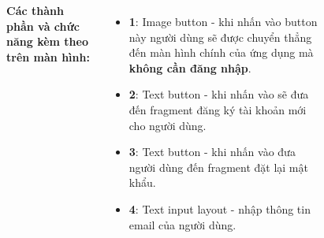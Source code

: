 \documentclass{beamer}
\begin{document}
\begin{frame}
\begin{columns}
\begin{figure}
        \end{figure}
        \indent \textbf{Các thành phần và chức năng kèm theo trên màn hình:}
        \begin{itemize}
            \item \textbf{1}: Image button - khi nhấn vào button này người dùng sẽ được chuyển thẳng đến màn hình chính của ứng dụng mà \textbf{không cần đăng nhập}.
            \item \textbf{2}: Text button - khi nhấn vào sẽ đưa đến fragment đăng ký tài khoản mới cho người dùng.
            \item \textbf{3}: Text button - khi nhấn vào đưa người dùng đến fragment đặt lại mật khẩu.
            \item \textbf{4}: Text input layout - nhập thông tin email của người dùng.
        \end{itemize}
    \end{columns}
\end{frame}
\end{document}
